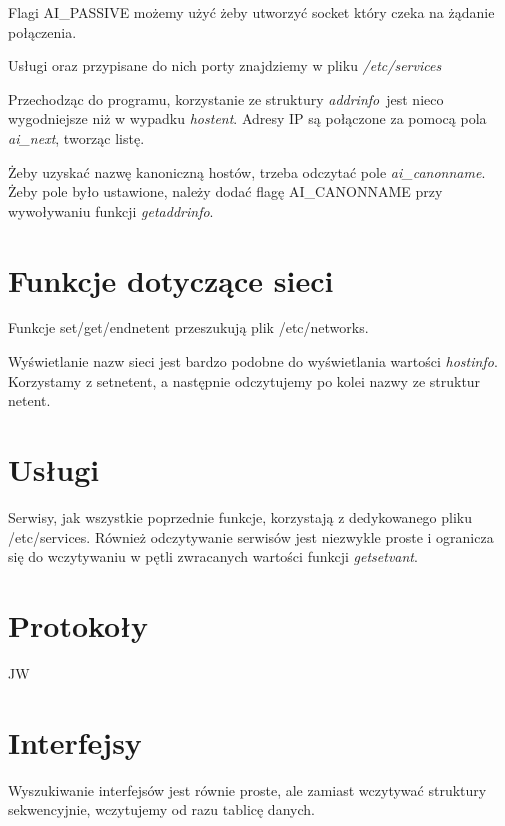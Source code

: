 \documentclass[a4paper, 11pt]{article}
\newcommand{\addrinfo}{\emph{addrinfo}}
\begin{document}
Flagi AI\_PASSIVE możemy użyć żeby utworzyć socket który czeka na żądanie połączenia.

Usługi oraz przypisane do nich porty znajdziemy w pliku \emph{/etc/services}

Przechodząc do programu, korzystanie ze struktury \addrinfo~jest nieco wygodniejsze niż w wypadku \emph{hostent}. Adresy IP są połączone za pomocą pola \emph{ai\_next}, tworząc listę. 

Żeby uzyskać nazwę kanoniczną hostów, trzeba odczytać pole \emph{ai\_canonname}. Żeby pole było ustawione, należy dodać flagę AI\_CANONNAME przy wywoływaniu funkcji \emph{getaddrinfo}.

\section*{Funkcje dotyczące sieci}

Funkcje set/get/endnetent przeszukują plik /etc/networks. 

Wyświetlanie nazw sieci jest bardzo podobne do wyświetlania wartości \emph{hostinfo}. Korzystamy z setnetent, a następnie odczytujemy po kolei nazwy ze struktur netent.

\section*{Usługi}

Serwisy, jak wszystkie poprzednie funkcje, korzystają z dedykowanego pliku /etc/services. Również odczytywanie serwisów jest niezwykle proste i ogranicza się do wczytywaniu w pętli zwracanych wartości funkcji \emph{getsetvant}.

\section*{Protokoły}
JW
\section*{Interfejsy}
Wyszukiwanie interfejsów jest równie proste, ale zamiast wczytywać struktury sekwencyjnie, wczytujemy od razu tablicę danych.
\end{document}
